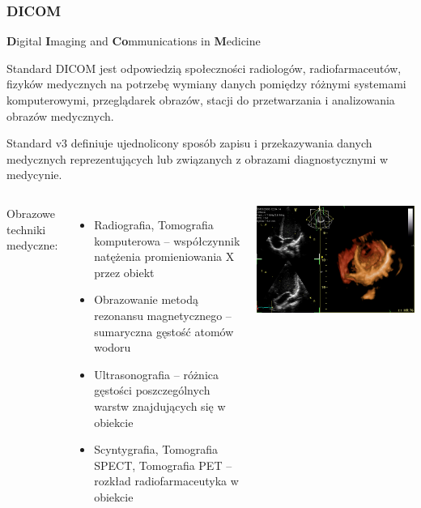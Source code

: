 \documentclass[aspectratio=169]{beamer}
\begin{document}
\begin{frame}[t]
    \frametitle{DICOM}
    \normalsize
    \textbf{D}igital \textbf{I}maging and \textbf{Co}mmunications in \textbf{M}edicine

    \vspace{1em}
    \scriptsize
    Standard DICOM jest odpowiedzią społeczności radiologów, radiofarmaceutów, fizyków medycznych na potrzebę wymiany danych pomiędzy różnymi systemami komputerowymi, przeglądarek obrazów, stacji do przetwarzania i analizowania obrazów medycznych.

    \vspace{1em}
    Standard \DICOM v3 definiuje ujednolicony sposób zapisu i przekazywania danych medycznych reprezentujących lub związanych z obrazami diagnostycznymi w medycynie.

    
    \begin{columns}[T]
        \vspace{1em}
        \normalsize
        \hspace*{0.3em}Obrazowe techniki medyczne:
        \scriptsize
        \begin{itemize}
            \item Radiografia, Tomografia komputerowa -- współczynnik natężenia promieniowania X przez obiekt
            \item Obrazowanie metodą rezonansu magnetycznego -- sumaryczna gęstość atomów wodoru
            \item Ultrasonografia -- różnica gęstości poszczególnych warstw znajdujących się w obiekcie
            \item Scyntygrafia, Tomografia SPECT, Tomografia PET -- rozkład radiofarmaceutyka w obiekcie
        \end{itemize}

        \includegraphics[height=0.4\textheight]{img/usg.png}
        

    \end{columns}
\end{frame}
\end{document}

